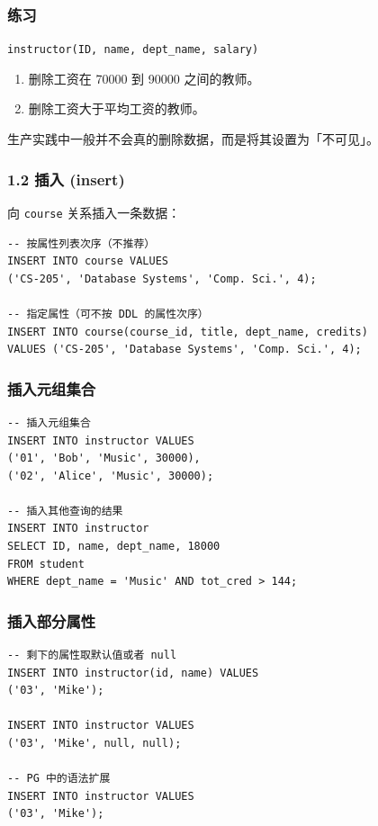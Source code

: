 \documentclass[aspectratio=169, 14pt]{beamer}
\begin{document}
\begin{frame}
    \frametitle{练习 {\large {}} }
    \texttt{instructor(ID, name, dept\_name, salary)}
    
    \begin{enumerate}
        \item 删除工资在 70000 到 90000 之间的教师。
        \item 删除工资大于平均工资的教师。
    \end{enumerate}

\end{frame}

{
\begin{frame}[standout]
  生产实践中一般并不会真的删除数据，而是将其设置为「不可见」。
\end{frame}
}

\begin{frame}[fragile]
    \frametitle{1.2 插入 (insert)}
向 \texttt{course} 关系插入一条数据：

\begin{verbatim}
-- 按属性列表次序（不推荐）
INSERT INTO course VALUES 
('CS-205', 'Database Systems', 'Comp. Sci.', 4);

-- 指定属性（可不按 DDL 的属性次序）
INSERT INTO course(course_id, title, dept_name, credits)
VALUES ('CS-205', 'Database Systems', 'Comp. Sci.', 4);
\end{verbatim}    

\end{frame}

\begin{frame}[fragile]
    \frametitle{插入元组集合}
    \begin{verbatim}
-- 插入元组集合
INSERT INTO instructor VALUES 
('01', 'Bob', 'Music', 30000),
('02', 'Alice', 'Music', 30000);

-- 插入其他查询的结果
INSERT INTO instructor
SELECT ID, name, dept_name, 18000
FROM student
WHERE dept_name = 'Music' AND tot_cred > 144;
    \end{verbatim} 

\end{frame}

\begin{frame}[fragile]
    \frametitle{插入部分属性}
    \begin{verbatim}
-- 剩下的属性取默认值或者 null
INSERT INTO instructor(id, name) VALUES 
('03', 'Mike');

INSERT INTO instructor VALUES 
('03', 'Mike', null, null);

-- PG 中的语法扩展
INSERT INTO instructor VALUES 
('03', 'Mike');
    \end{verbatim}
\end{frame}
\end{document}
